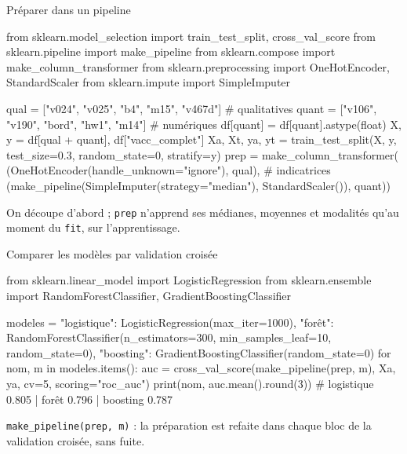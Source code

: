 \documentclass[aspectratio=169,11pt]{beamer}
\begin{document}
\begin{frame}[fragile]{Préparer dans un pipeline}
\begin{python}[basicstyle=\ttfamily\scriptsize]
from sklearn.model_selection import train_test_split, cross_val_score
from sklearn.pipeline import make_pipeline
from sklearn.compose import make_column_transformer
from sklearn.preprocessing import OneHotEncoder, StandardScaler
from sklearn.impute import SimpleImputer

qual = ["v024", "v025", "b4", "m15", "v467d"]          # qualitatives
quant = ["v106", "v190", "bord", "hw1", "m14"]          # numériques
df[quant] = df[quant].astype(float)
X, y = df[qual + quant], df["vacc_complet"]
Xa, Xt, ya, yt = train_test_split(X, y, test_size=0.3, random_state=0, stratify=y)
prep = make_column_transformer(
    (OneHotEncoder(handle_unknown="ignore"), qual),                       # indicatrices
    (make_pipeline(SimpleImputer(strategy="median"), StandardScaler()), quant))
\end{python}
\vskip-1mm
{\small\color{cnfGris}On découpe d'abord ; \texttt{prep} n'apprend ses médianes, moyennes et modalités qu'au moment du \texttt{fit}, sur l'apprentissage.}
\end{frame}

\begin{frame}[fragile]{Comparer les modèles par validation croisée}
\begin{python}[basicstyle=\ttfamily\scriptsize]
from sklearn.linear_model import LogisticRegression
from sklearn.ensemble import RandomForestClassifier, GradientBoostingClassifier

modeles = {"logistique": LogisticRegression(max_iter=1000),
           "forêt": RandomForestClassifier(n_estimators=300, min_samples_leaf=10,
                                           random_state=0),
           "boosting": GradientBoostingClassifier(random_state=0)}
for nom, m in modeles.items():
    auc = cross_val_score(make_pipeline(prep, m), Xa, ya, cv=5, scoring="roc_auc")
    print(nom, auc.mean().round(3))
# logistique 0.805 | forêt 0.796 | boosting 0.787
\end{python}
\vskip-1mm
{\small\color{cnfGris}\texttt{make\_pipeline(prep, m)} : la préparation est refaite dans chaque bloc de la validation croisée, sans fuite.}
\end{frame}
\end{document}
